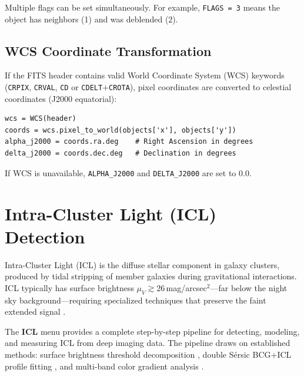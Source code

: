 \documentclass[11pt,fleqn]{book}
\begin{document}
Multiple flags can be set simultaneously. For example, \texttt{FLAGS = 3} means the object has neighbors (1) and was deblended (2).

\section{WCS Coordinate Transformation}

If the FITS header contains valid World Coordinate System (WCS) keywords (\texttt{CRPIX}, \texttt{CRVAL}, \texttt{CD} or \texttt{CDELT}+\texttt{CROTA}), pixel coordinates are converted to celestial coordinates (J2000 equatorial):

\begin{codebox}
\begin{lstlisting}[style=python,numbers=none]
wcs = WCS(header)
coords = wcs.pixel_to_world(objects['x'], objects['y'])
alpha_j2000 = coords.ra.deg    # Right Ascension in degrees
delta_j2000 = coords.dec.deg   # Declination in degrees
\end{lstlisting}
\end{codebox}

If WCS is unavailable, \texttt{ALPHA\_J2000} and \texttt{DELTA\_J2000} are set to 0.0.


\chapter{Intra-Cluster Light (ICL) Detection}
\label{ch:icl}

Intra-Cluster Light (ICL) is the diffuse stellar component in galaxy clusters, produced by tidal stripping of member galaxies during gravitational interactions.  ICL typically has surface brightness $\mu_V \gtrsim 26$\,mag/arcsec$^2$---far below the night sky background---requiring specialized techniques that preserve the faint extended signal \parencite{montes2018,rudick2011}.

The \textbf{ICL} menu provides a complete step-by-step pipeline for detecting, modeling, and measuring ICL from deep imaging data.  The pipeline draws on established methods: surface brightness threshold decomposition \parencite{rudick2011,jimenez-teja2018}, double S\'ersic BCG+ICL profile fitting \parencite{kluge2020}, and multi-band color gradient analysis \parencite{montes2018,huang2018}.
\end{document}
